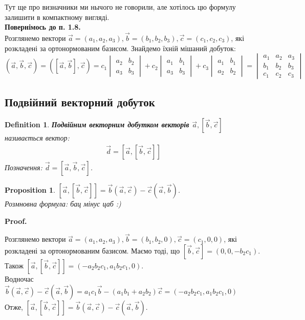 \documentclass[a4paper, 10pt]{extarticle}
\makeatletter
\def\qed{$\blacksquare$}
\def\qed{$\blacksquare$}
\theoremstyle{theoremdd}
\theoremstyle{theoremdd}
\newtheorem{definition}[theorem]{Definition}
\theoremstyle{theoremdd}
\theoremstyle{theoremdd}
\theoremstyle{theoremdd}
\newtheorem{proposition}[theorem]{Proposition}
\theoremstyle{theoremdd}
\theoremstyle{theoremdd}
\theoremstyle{theoremdd}
\renewenvironment{proof}[1][Proof.\\]{\par
\pushQED{\hfill \qed}%
\normalfont \topsep6\p@\@plus6\p@\relax
\trivlist
\item\relax
{\bfseries
#1\@addpunct{.}}\hspace\labelsep\ignorespaces
}{%
\popQED\endtrivlist\@endpefalse
}
\makeatother
\begin{document}
Тут ще про визначники ми нычого не говорили, але хотілось цю формулу залишити в компактному вигляді.
\bigskip \\
\textbf{Повернімось до п. 1.8.}\\
Розглянемо вектори $\vec{a} = (a_1,a_2,a_3), \vec{b} = (b_1,b_2,b_3), \vec{c} = (c_1,c_2,c_3)$, які розкладені за ортонормованим базисом. Знайдемо їхній мішаний добуток:\\
$(\vec{a}, \vec{b}, \vec{c}) = ([\vec{a}, \vec{b}], \vec{c}) = c_1 \begin{vmatrix} a_2 & b_2 \\ a_3 & b_3 \end{vmatrix} + c_2 \begin{vmatrix} a_1 & b_1 \\ a_3 & b_3 \end{vmatrix} + c_3 \begin{vmatrix} a_1 & b_1 \\ a_2 & b_2 \end{vmatrix} = \begin{vmatrix}
a_1 & a_2 & a_3 \\
b_1 & b_2 & b_3 \\
c_1 & c_2 & c_3
\end{vmatrix}$

\subsection{Подвійний векторний добуток}
\begin{definition}
\textbf{Подвійним векторним добутком векторів $\vec{a}, [\vec{b},\vec{c}]$} називається вектор:
\begin{align*}
\vec{d} = [\vec{a},[\vec{b},\vec{c}]]
\end{align*}
Позначення: $\vec{d} = [\vec{a},\vec{b},\vec{c}]$.
\end{definition}

\begin{proposition}
$[\vec{a},[\vec{b},\vec{c}]] = \vec{b} (\vec{a}, \vec{c}) - \vec{c} (\vec{a}, \vec{b})$.\\
\textit{Розмновна формула: бац мінус цаб :)}
\end{proposition}

\begin{proof}
Розглянемо вектори $\vec{a} = (a_1, a_2, a_3), \vec{b} = (b_1,b_2,0), \vec{c} = (c_1,0,0)$, які розкладені за ортонормованим базисом. Маємо тоді, що $[\vec{b}, \vec{c}] = (0,0,-b_2 c_1)$.\\
Також $[\vec{a}, [\vec{b}, \vec{c}]] = (-a_2b_2c_1, a_1b_2c_1,0)$.\\
Водночас $\vec{b} (\vec{a}, \vec{c}) - \vec{c} (\vec{a}, \vec{b}) = a_1c_1\vec{b} - (a_1b_1+a_2b_2)\vec{c} = (-a_2b_2c_1,a_1b_2c_1,0)$\\
Отже, $[\vec{a},[\vec{b},\vec{c}]] = \vec{b} (\vec{a}, \vec{c}) - \vec{c} (\vec{a}, \vec{b})$.
\end{proof}
\end{document}
